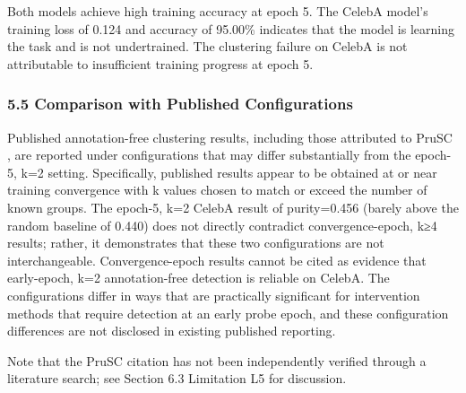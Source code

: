 Both models achieve high training accuracy at epoch 5. The CelebA model's training loss of 0.124 and accuracy of 95.00\% indicates that the model is learning the task and is not undertrained. The clustering failure on CelebA is not attributable to insufficient training progress at epoch 5.

\subsubsection{5.5 Comparison with Published Configurations}

Published annotation-free clustering results, including those attributed to PruSC \citep{Kimetal2024}, are reported under configurations that may differ substantially from the epoch-5, k=2 setting. Specifically, published results appear to be obtained at or near training convergence with k values chosen to match or exceed the number of known groups. The epoch-5, k=2 CelebA result of purity=0.456 (barely above the random baseline of 0.440) does not directly contradict convergence-epoch, k≥4 results; rather, it demonstrates that these two configurations are not interchangeable. Convergence-epoch results cannot be cited as evidence that early-epoch, k=2 annotation-free detection is reliable on CelebA. The configurations differ in ways that are practically significant for intervention methods that require detection at an early probe epoch, and these configuration differences are not disclosed in existing published reporting.

Note that the PruSC citation has not been independently verified through a literature search; see Section 6.3 Limitation L5 for discussion.

